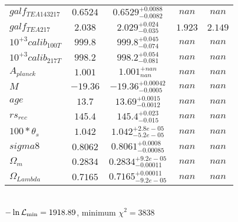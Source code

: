 \begin{tabular}{|l|c|c|c|c|}
$galf_{TE A 143 217 }$ &$0.6524$ & $0.6529_{-0.0082}^{+0.0088}$ & $nan$ & $nan$ \\ 
$galf_{TE A 217 }$ &$2.038$ & $2.029_{-0.035}^{+0.024}$ & $1.923$ & $2.149$ \\ 
$10^{+3}calib_{100T }$ &$999.8$ & $999.8_{-0.074}^{+0.045}$ & $nan$ & $nan$ \\ 
$10^{+3}calib_{217T }$ &$998.2$ & $998.2_{-0.081}^{+0.054}$ & $nan$ & $nan$ \\ 
$A_{planck }$ &$1.001$ & $1.001_{nan}^{+nan}$ & $nan$ & $nan$ \\ 
$M$ &$-19.36$ & $-19.36_{-0.0005}^{+0.00042}$ & $nan$ & $nan$ \\ 
$age$ &$13.7$ & $13.69_{-0.0012}^{+0.0015}$ & $nan$ & $nan$ \\ 
$rs_{rec }$ &$145.4$ & $145.4_{-0.015}^{+0.023}$ & $nan$ & $nan$ \\ 
$100*\theta{}_{s }$ &$1.042$ & $1.042_{-5.2e-05}^{+2.8e-05}$ & $nan$ & $nan$ \\ 
$sigma8$ &$0.8062$ & $0.8061_{-0.00085}^{+0.0008}$ & $nan$ & $nan$ \\ 
$\Omega{}_{m }$ &$0.2834$ & $0.2834_{-0.00011}^{+9.2e-05}$ & $nan$ & $nan$ \\ 
$\Omega{}_{Lambda }$ &$0.7165$ & $0.7165_{-9.2e-05}^{+0.00011}$ & $nan$ & $nan$ \\ 
\hline 
 \end{tabular} \\ 
$-\ln{\cal L}_\mathrm{min} =1918.89$, minimum $\chi^2=3838$ \\ 
